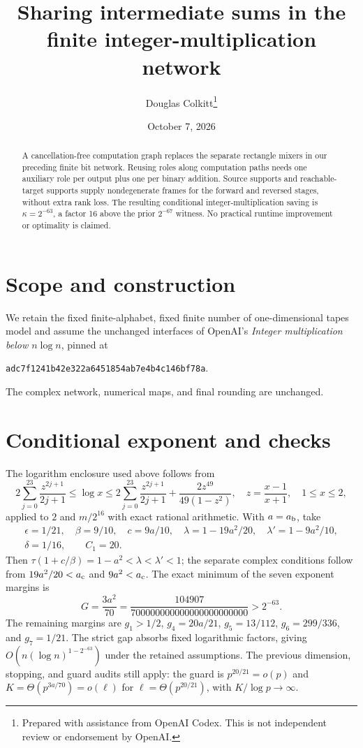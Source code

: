 \documentclass[11pt]{article}
\title{Sharing intermediate sums in the finite integer-multiplication network}
\author{Douglas Colkitt\thanks{Prepared with assistance from OpenAI Codex.
This is not independent review or endorsement by OpenAI.}}
\date{October 7, 2026}
\begin{document}
\maketitle
\begin{abstract}
A cancellation-free computation graph replaces the separate rectangle mixers
in our preceding finite bit network. Reusing roles along computation paths
needs one auxiliary role per output plus one per binary addition. Source
supports and reachable-target supports supply nondegenerate frames for the
forward and reversed stages, without extra rank loss. The resulting conditional
integer-multiplication saving is $\kappa=2^{-63}$, a factor 16 above the prior
$2^{-67}$ witness. No practical runtime improvement or optimality is claimed.
\end{abstract}

\section{Scope and construction}
We retain the fixed finite-alphabet, fixed finite number of one-dimensional
tapes model and assume the unchanged interfaces of OpenAI's
\emph{Integer multiplication below $n\log n$}, pinned at
\begin{center}\texttt{adc7f1241b42e322a6451854ab7e4b4c146bf78a}.\end{center}
The complex network, numerical maps, and final rounding are unchanged.


\section{Conditional exponent and checks}
The logarithm enclosure used above follows from
\[
 2\sum_{j=0}^{23}\frac{z^{2j+1}}{2j+1}\le\log x\le
 2\sum_{j=0}^{23}\frac{z^{2j+1}}{2j+1}
 +\frac{2z^{49}}{49(1-z^2)},\quad z=\frac{x-1}{x+1},\quad 1\le x\le2,
\]
applied to $2$ and $m/2^{16}$ with exact rational arithmetic.
With $a=a_{\rm b}$, take
\begin{gather*}
 \epsilon=1/21,\quad\beta=9/10,\quad c=9a/10,\quad
 \lambda=1-19a^2/20,\quad\lambda'=1-9a^2/10,\\
 \delta=1/16,\qquad C_1=20.
\end{gather*}
Then $\tau(1+c/\beta)=1-a^2<\lambda<\lambda'<1$; the separate complex
conditions follow from $19a^2/20<a_{\rm c}$ and $9a^2<a_{\rm c}$. The exact
minimum of the seven exponent margins is
\[
 G=\frac{3a^2}{70}=\frac{104907}{700000000000000000000000}>2^{-63}.
\]
The remaining margins are $g_1>1/2$, $g_4=20a/21$, $g_5=13/112$,
$g_6=299/336$, and $g_7=1/21$. The strict gap absorbs fixed logarithmic
factors, giving $O(n(\log n)^{1-2^{-63}})$ under the retained assumptions.
The previous dimension, stopping, and guard audits still apply: the guard
is $p^{20/21}=o(p)$ and $K=\Theta(p^{3a/70})=o(\ell)$ for
$\ell=\Theta(p^{20/21})$, with $K/\log p\to\infty$.
\end{document}
